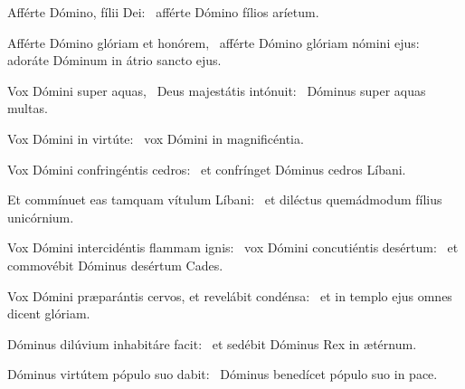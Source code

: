 \item Afférte Dómino, fílii Dei:~\psstar{} afférte Dómino fílios aríetum.

\item Afférte Dómino glóriam et honórem,~\pscross{} afférte Dómino glóriam nómini ejus:~\psstar{} adoráte Dóminum in átrio sancto ejus.

\item Vox Dómini super aquas,~\pscross{} Deus majestátis intónuit:~\psstar{} Dóminus super aquas multas.

\item Vox Dómini in virtúte:~\psstar{} vox Dómini in magnificéntia.

\item Vox Dómini confringéntis cedros:~\psstar{} et confrínget Dóminus cedros Líbani.

\item Et commínuet eas tamquam vítulum Líbani:~\psstar{} et diléctus quemádmodum fílius unicórnium.

\item Vox Dómini intercidéntis flammam ignis:~\pscross{} vox Dómini concutiéntis desértum:~\psstar{} et commovébit Dóminus desértum Cades.

\item Vox Dómini præparántis cervos, et revelábit condénsa:~\psstar{} et in templo ejus omnes dicent glóriam.

\item Dóminus dilúvium inhabitáre facit:~\psstar{} et sedébit Dóminus Rex in ætérnum.

\item Dóminus virtútem pópulo suo dabit:~\psstar{} Dóminus benedícet pópulo suo in pace.

